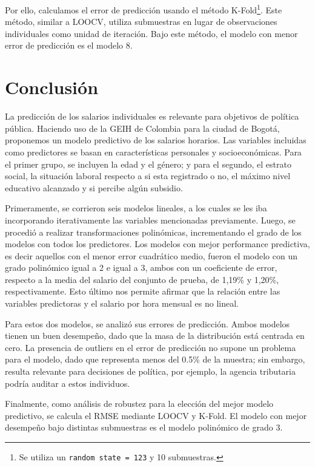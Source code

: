 \documentclass[11pt,oneside]{article}
\newcommand{\code}{\texttt}
\begin{document}
Por ello, calculamos el error de predicción usando el método K-Fold\footnote{Se utiliza un \code{random state = 123} y 10 submuestras.}. Este método, similar a LOOCV, utiliza submuestras en lugar de observaciones individuales como unidad de iteración. Bajo este método, el modelo con menor error de predicción es el modelo 8.

\newpage

\section{Conclusión}

La predicción de los salarios individuales es relevante para objetivos de política pública. Haciendo uso de la GEIH de Colombia para la ciudad de Bogotá, proponemos un modelo predictivo de los salarios horarios. Las variables incluidas como predictores se basan en características personales y socioeconómicas. Para el primer grupo, se incluyen la edad y el género; y para el segundo, el estrato social, la situación laboral respecto a si esta registrado o no, el máximo nivel educativo alcanzado y si percibe algún subsidio. 

Primeramente, se corrieron seis modelos lineales, a los cuales se les iba incorporando iterativamente las variables mencionadas previamente. Luego, se procedió a realizar transformaciones polinómicas, incrementando el grado de los modelos con todos los predictores. Los modelos con mejor performance predictiva, es decir aquellos con el menor error cuadrático medio, fueron el modelo con un grado polinómico igual a 2 e igual a 3, ambos con un coeficiente de error, respecto a la media del salario del conjunto de prueba, de 1,19\% y 1,20\%, respectivamente. Esto último nos permite afirmar que la relación entre las variables predictoras y el salario por hora mensual es no lineal. 

Para estos dos modelos, se analizó sus errores de predicción. Ambos modelos tienen un buen desempeño, dado que la masa de la distribución está centrada en cero. La presencia de outliers en el error de predicción no supone un problema para el modelo, dado que representa menos del 0.5\% de la muestra; sin embargo, resulta relevante para decisiones de política, por ejemplo, la agencia tributaria podría auditar a estos individuos.

Finalmente, como análisis de robustez para la elección del mejor modelo predictivo, se calcula el RMSE mediante LOOCV y K-Fold. El modelo con mejor desempeño bajo distintas submuestras es el modelo polinómico de grado 3. 
\end{document}
